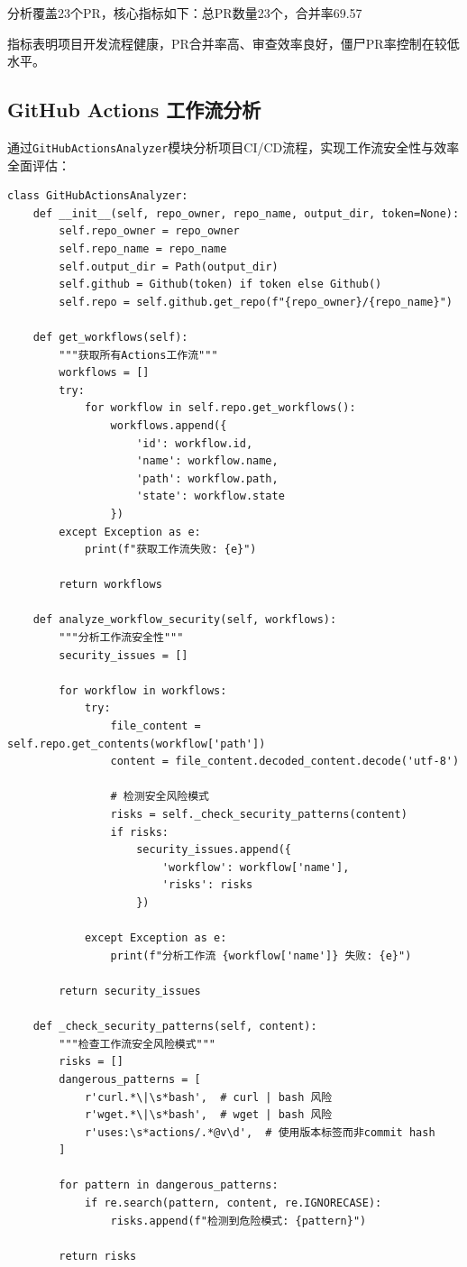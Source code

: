 分析覆盖23个PR，核心指标如下：总PR数量23个，合并率69.57%

指标表明项目开发流程健康，PR合并率高、审查效率良好，僵尸PR率控制在较低水平。

\subsection{GitHub Actions 工作流分析}
通过\texttt{GitHubActionsAnalyzer}模块分析项目CI/CD流程，实现工作流安全性与效率全面评估：

\begin{verbatim}
class GitHubActionsAnalyzer:
    def __init__(self, repo_owner, repo_name, output_dir, token=None):
        self.repo_owner = repo_owner
        self.repo_name = repo_name
        self.output_dir = Path(output_dir)
        self.github = Github(token) if token else Github()
        self.repo = self.github.get_repo(f"{repo_owner}/{repo_name}")

    def get_workflows(self):
        """获取所有Actions工作流"""
        workflows = []
        try:
            for workflow in self.repo.get_workflows():
                workflows.append({
                    'id': workflow.id,
                    'name': workflow.name,
                    'path': workflow.path,
                    'state': workflow.state
                })
        except Exception as e:
            print(f"获取工作流失败: {e}")

        return workflows

    def analyze_workflow_security(self, workflows):
        """分析工作流安全性"""
        security_issues = []

        for workflow in workflows:
            try:
                file_content = self.repo.get_contents(workflow['path'])
                content = file_content.decoded_content.decode('utf-8')

                # 检测安全风险模式
                risks = self._check_security_patterns(content)
                if risks:
                    security_issues.append({
                        'workflow': workflow['name'],
                        'risks': risks
                    })

            except Exception as e:
                print(f"分析工作流 {workflow['name']} 失败: {e}")

        return security_issues

    def _check_security_patterns(self, content):
        """检查工作流安全风险模式"""
        risks = []
        dangerous_patterns = [
            r'curl.*\|\s*bash',  # curl | bash 风险
            r'wget.*\|\s*bash',  # wget | bash 风险
            r'uses:\s*actions/.*@v\d',  # 使用版本标签而非commit hash
        ]

        for pattern in dangerous_patterns:
            if re.search(pattern, content, re.IGNORECASE):
                risks.append(f"检测到危险模式: {pattern}")

        return risks
\end{verbatim}

